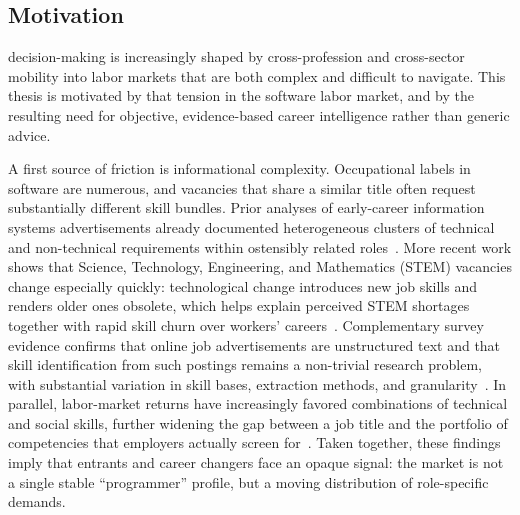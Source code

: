 \subsection{Motivation}
\label{sec:motivation}

 decision-making is increasingly shaped by cross-profession and cross-sector mobility into labor markets that are both complex and difficult to navigate.
This thesis is motivated by that tension in the software labor market, and by the resulting need for objective, evidence-based career intelligence rather than generic advice.

A first source of friction is informational complexity.
Occupational labels in software are numerous, and vacancies that share a similar title often request substantially different skill bundles.
Prior analyses of early-career information systems advertisements already documented heterogeneous clusters of technical and non-technical requirements within ostensibly related roles~\cite{Kennan2008}.
More recent work shows that Science, Technology, Engineering, and Mathematics (STEM) vacancies change especially quickly: technological change introduces new job skills and renders older ones obsolete, which helps explain perceived STEM shortages together with rapid skill churn over workers' careers~\cite{DemingNoray2018}.
Complementary survey evidence confirms that online job advertisements are unstructured text and that skill identification from such postings remains a non-trivial research problem, with substantial variation in skill bases, extraction methods, and granularity~\cite{Khaouja2021}.
In parallel, labor-market returns have increasingly favored combinations of technical and social skills, further widening the gap between a job title and the portfolio of competencies that employers actually screen for~\cite{Deming2017}.
Taken together, these findings imply that entrants and career changers face an opaque signal: the market is not a single stable ``programmer'' profile, but a moving distribution of role-specific demands.

